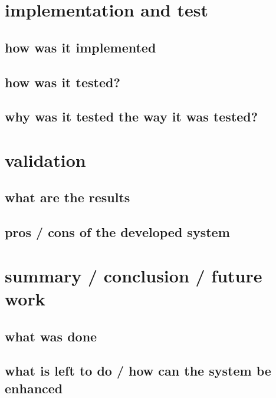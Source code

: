 \section{implementation and test}
\subsection{how was it implemented}
\subsection{how was it tested?}
\subsection{why was it tested the way it was tested?}
\section{validation}
\subsection{what are the results}
\subsection{pros / cons of the developed system}
\section{summary / conclusion / future work}
\subsection{what was done}
\subsection{what is left to do / how can the system be enhanced}



